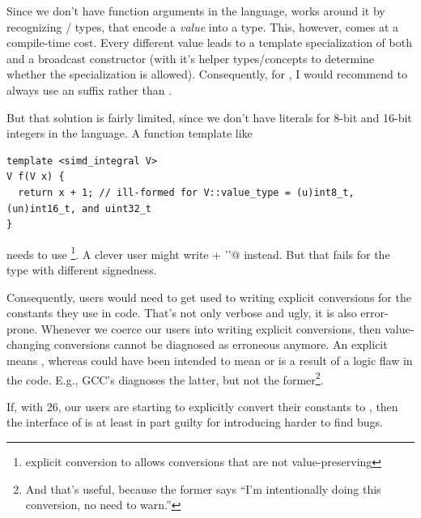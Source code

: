 Since we don't have  function arguments in the language,  works
around it by recognizing  /  types, that
encode a \emph{value} into a type.
This, however, comes at a compile-time cost.
Every different value leads to a template specialization of both  and a
 broadcast constructor (with it's helper types/concepts to determine whether the
specialization is allowed).
Consequently, for , I would recommend to always use an  suffix rather than
.

But that solution is fairly limited, since we don't have literals for 8-bit and 16-bit integers in
the language.
A function template like
\medskip\begin{lstlisting}[style=Vc]
template <simd_integral V>
V f(V x) {
  return x + 1; // ill-formed for V::value_type = (u)int8_t, (un)int16_t, and uint32_t
}
\end{lstlisting}
needs to use \footnote{explicit conversion to  allows conversions
that are not value-preserving}.
A clever user might write \lstinline@x + '\1'@ instead.
But that fails for the  type with different signedness.

Consequently, users would need to get used to writing explicit conversions for the constants they
use in  code.
That's not only verbose and ugly, it is also error-prone.
Whenever we coerce our users into writing explicit conversions, then value-changing conversions
cannot be diagnosed as erroneous anymore.
An explicit  means , whereas
 could have been intended to mean  or is a result
of a logic flaw in the code.
E.g., GCC's  diagnoses the latter, but not the former\footnote{And that's
useful, because the former says “I'm intentionally doing this conversion, no need to warn.”}.

If, with \CC{}26, our users are starting to explicitly convert their  constants to
, then the interface of  is at least in part guilty for introducing
harder to find bugs.

